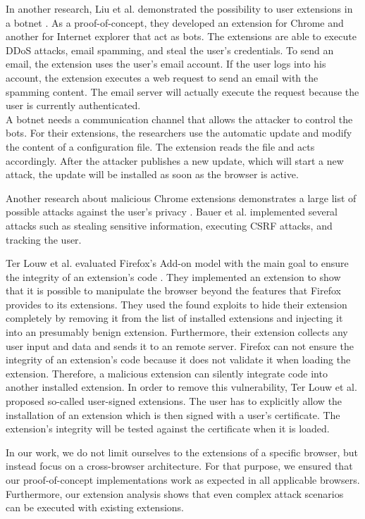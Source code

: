 	In another research, Liu et al. demonstrated the possibility to user extensions in a botnet \cite{liu2011botnet}. As a proof-of-concept, they developed an extension for Chrome and another for Internet explorer that act as bots. The extensions are able to execute DDoS attacks, email spamming, and steal the user's credentials. To send an email, the extension uses the user's email account. If the user logs into his account, the extension executes a web request to send an email with the spamming content. The email server will actually execute the request because the user is currently authenticated. \\
 	A botnet needs a communication channel that allows the attacker to control the bots. For their extensions, the researchers use the automatic update and modify the content of a configuration file. The extension reads the file and acts accordingly. After the attacker publishes a new update, which will start a new attack, the update will be installed as soon as the browser is active. 
 	
	Another research about malicious Chrome extensions demonstrates a large list of possible attacks against the user's privacy \cite{extensions:cns14}. Bauer et al. implemented several attacks such as stealing sensitive information, executing CSRF attacks, and tracking the user. 
	 
	Ter Louw et al. evaluated Firefox's Add-on model with the main goal to ensure the integrity of an extension's code \cite{TerLouw:2007:EWB:1420581.1420583}. They implemented an extension to show that it is possible to manipulate the browser beyond the features that Firefox provides to its extensions. They used the found exploits to hide their extension completely by removing it from the list of installed extensions and injecting it into an presumably benign extension. Furthermore, their extension collects any user input and data and sends it to an remote server. Firefox can not ensure the integrity of an extension's code because it does not validate it when loading the extension. Therefore, a malicious extension can silently integrate code into another installed extension. In order to remove this vulnerability, Ter Louw et al. proposed so-called user-signed extensions. The user has to explicitly allow the installation of an extension which is then signed with a user's certificate. The extension's integrity will be tested against the certificate when it is loaded. 

	In our work, we do not limit ourselves to the extensions of a specific browser, but instead focus on a cross-browser architecture. For that purpose, we ensured that our proof-of-concept implementations work as expected in all applicable browsers. Furthermore, our extension analysis shows that even complex attack scenarios can be executed with existing extensions.
	
